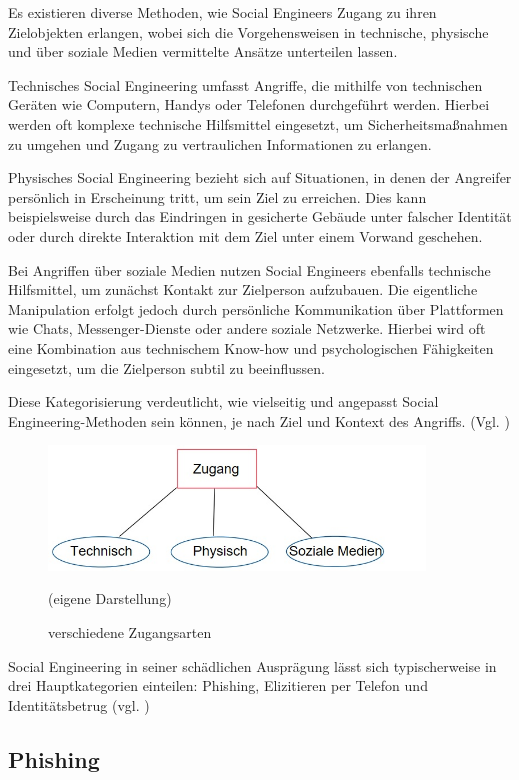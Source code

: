 Es existieren diverse Methoden, wie Social Engineers Zugang zu ihren Zielobjekten erlangen, wobei sich die Vorgehensweisen in technische, physische und über soziale Medien vermittelte Ansätze unterteilen lassen.

Technisches Social Engineering umfasst Angriffe, die mithilfe von technischen Geräten wie Computern, Handys oder Telefonen durchgeführt werden. Hierbei werden oft komplexe technische Hilfsmittel eingesetzt, um Sicherheitsmaßnahmen zu umgehen und Zugang zu vertraulichen Informationen zu erlangen.

Physisches Social Engineering bezieht sich auf Situationen, in denen der Angreifer persönlich in Erscheinung tritt, um sein Ziel zu erreichen. Dies kann beispielsweise durch das Eindringen in gesicherte Gebäude unter falscher Identität oder durch direkte Interaktion mit dem Ziel unter einem Vorwand geschehen.

Bei Angriffen über soziale Medien nutzen Social Engineers ebenfalls technische Hilfsmittel, um zunächst Kontakt zur Zielperson aufzubauen. Die eigentliche Manipulation erfolgt jedoch durch persönliche Kommunikation über Plattformen wie Chats, Messenger-Dienste oder andere soziale Netzwerke. Hierbei wird oft eine Kombination aus technischem Know-how und psychologischen Fähigkeiten eingesetzt, um die Zielperson subtil zu beeinflussen.

Diese Kategorisierung verdeutlicht, wie vielseitig und angepasst Social Engineering-Methoden sein können, je nach Ziel und Kontext des Angriffs. (Vgl. \cite{SEtechPhysSoc})

\begin{figure}[h]
    \centering
\includegraphics[width = 10cm]{figures/Zugang.jpg}
\caption{verschiedene Zugangsarten}
(eigene Darstellung)
\label{fig:verschiedene Zugangsarten}
\end{figure}

Social Engineering in seiner schädlichen Ausprägung lässt sich typischerweise in drei Hauptkategorien einteilen: Phishing, Elizitieren per Telefon und Identitätsbetrug (vgl. \cite{GrundformenDesSE})

\subsection{Phishing}

